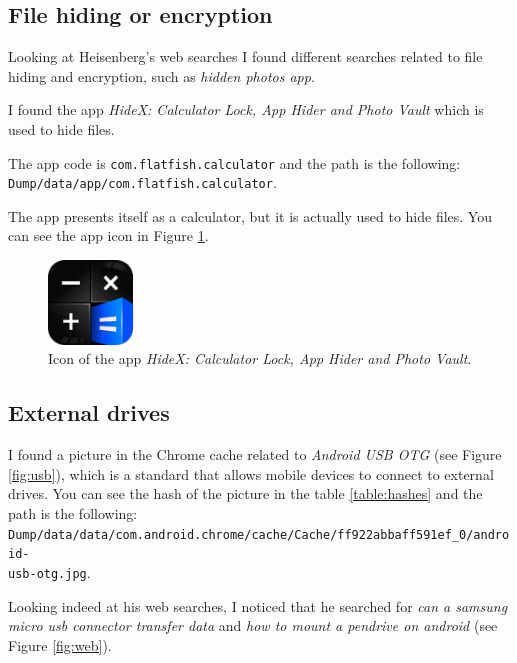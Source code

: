 \documentclass[12pt]{article}
\begin{document}
\subsection{File hiding or encryption}
\label{sec:file-hiding}

Looking at Heisenberg's web searches I found different searches related to file hiding and encryption, such as \textit{hidden photos app}.

I found the app \textit{HideX: Calculator Lock, App Hider and Photo Vault} \cite{calculator} which is used to hide files.

The app code is \texttt{com.flatfish.calculator} and the path is the following: \\
\texttt{Dump/data/app/com.flatfish.calculator}. 

The app presents itself as a calculator, but it is actually used to hide files. You can see the app icon in Figure \ref{fig:calc}.

\begin{figure}[!ht]
    \centering
    \includegraphics[width=0.2\textwidth]{images/icon.png}
    \caption{Icon of the app \textit{HideX: Calculator Lock, App Hider and Photo Vault}.}
    \label{fig:calc}
\end{figure}

\subsection{External drives}

I found a picture in the Chrome cache related to \textit{Android USB OTG} (see Figure \ref{fig:usb}), which is a standard that allows mobile devices to connect to external drives. You can see the hash of the picture in the table \ref{table:hashes} and the path is the following:\\
\texttt{Dump/data/data/com.android.chrome/cache/Cache/ff922abbaff591ef\_0/android-\\usb-otg.jpg}.

Looking indeed at his web searches, I noticed that he searched for \textit{can a samsung micro usb connector transfer data} and \textit{how to mount a pendrive on android} (see Figure \ref{fig:web}).
\end{document}

